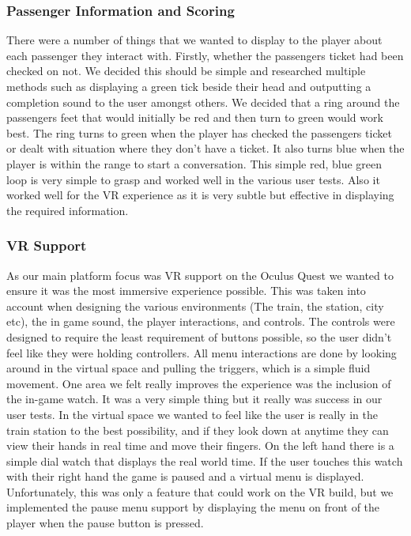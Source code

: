 \subsubsection{Passenger Information and Scoring}
There were a number of things that we wanted to display to the player about each passenger they interact with. Firstly, whether the passengers ticket had been checked on not. We decided this should be simple and researched multiple methods such as displaying a green tick beside their head and outputting a completion sound to the user amongst others. We decided that a ring around the passengers feet that would initially be red and then turn to green would work best. The ring turns to green when the player has checked the passengers ticket or dealt with situation where they don't have a ticket. It also turns blue when the player is within the range to start a conversation. This simple red, blue green loop is very simple to grasp and worked well in the various user tests. Also it worked well for the VR experience as it is very subtle but effective in displaying the required information.

\subsubsection{VR Support}
As our main platform focus was VR support on the Oculus Quest we wanted to ensure it was the most immersive experience possible. This was taken into account when designing the various environments (The train, the station, city etc), the in game sound, the player interactions, and controls. The controls were designed to require the least requirement of buttons possible, so the user didn't feel like they were holding controllers. All menu interactions are done by looking around in the virtual space and pulling the triggers, which is a simple fluid movement. One area we felt really improves the experience was the inclusion of the in-game watch. It was a very simple thing but it really was success in our user tests. In the virtual space we wanted to feel like the user is really in the train station to the best possibility, and if they look down at anytime they can view their hands in real time and move their fingers. On the left hand there is a simple dial watch that displays the real world time. If the user touches this watch with their right hand the game is paused and a virtual menu is displayed. Unfortunately, this was only a feature that could work on the VR build, but we implemented the pause menu support by displaying the menu on front of the player when the pause button is pressed.

